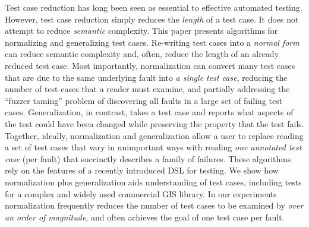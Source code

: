 Test case reduction has long been seen as essential to effective automated testing.  However, test case reduction simply reduces the \emph{length} of a test case.  It does not attempt to reduce \emph{semantic} complexity.  This paper presents algorithms for normalizing and generalizing test cases.  Re-writing test cases into a \emph{normal form} can reduce semantic complexity and, often, reduce the length of an already reduced test case.  Most importantly, normalization can convert many test cases that are due to the same underlying fault into \emph{a single test case}, reducing the number of test cases that a reader must examine, and partially addressing the ``fuzzer taming'' problem of discovering all faults in a large set of failing test cases.  Generalization, in contrast, takes a test case and reports what aspects of the test could have been changed while preserving the property that the test fails.  Together, ideally, normalization and generalization allow a user to replace reading a set of test cases that vary in unimportant ways with reading \emph{one annotated test case} (per fault) that succinctly describes a family of failures.  These algorithms rely on the features of a recently introduced DSL for testing.   We show how normalization plus generalization aids understanding of test cases, including tests for a complex and widely used commercial GIS library.  In our experiments normalization frequently reduces the number of test cases to be examined by \emph{over an order of magnitude}, and often achieves the goal of one test case per fault.